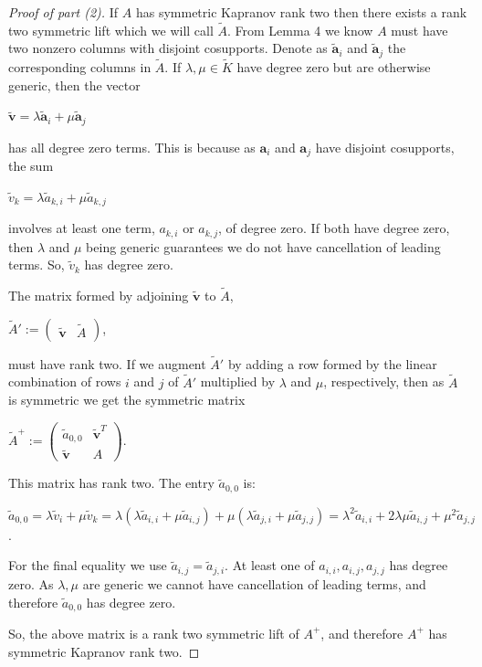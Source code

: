 \documentclass{article}
\begin{document}
\begin{proof}[Proof of part (2)]
  If $A$ has symmetric Kapranov rank two then there exists a rank two symmetric lift which we will call $\tilde{A}$. From Lemma 4 we know $A$ must have two nonzero columns with disjoint cosupports. Denote as $\tilde{\textbf{a}}_{i}$ and $\tilde{\textbf{a}}_{j}$ the corresponding columns in $\tilde{A}$. If $\lambda, \mu \in \tilde{K}$ have degree zero but are otherwise generic, then the vector
  \begin{center}
    $\tilde{\textbf{v}} = \lambda\tilde{\textbf{a}}_{i} + \mu\tilde{\textbf{a}}_{j}$
  \end{center}
  has all degree zero terms. This is because as $\textbf{a}_{i}$ and $\textbf{a}_{j}$ have disjoint cosupports, the sum
  \begin{center}
    $\tilde{v}_{k} = \lambda \tilde{a}_{k,i} + \mu \tilde{a}_{k,j}$
  \end{center}
  involves at least one term, $a_{k,i}$ or $a_{k,j}$, of degree zero. If both have degree zero, then $\lambda$ and $\mu$ being generic guarantees we do not have cancellation of leading terms. So, $\tilde{v}_{k}$ has degree zero.

  The matrix formed by adjoining $\tilde{\textbf{v}}$ to $\tilde{A}$,
  \begin{center}
    $\tilde{A}' := \left(\begin{array}{cc} \tilde{\textbf{v}} & \tilde{A} \end{array}\right)$,
  \end{center}
  must have rank two. If we augment $\tilde{A}'$ by adding a row formed by the linear combination of rows $i$ and $j$ of $\tilde{A}'$ multiplied by $\lambda$ and $\mu$, respectively, then as $\tilde{A}$ is symmetric we get the symmetric matrix
  \begin{center}
    $\tilde{A}^{+} := \left(\begin{array}{cc} \tilde{a}_{0,0} & \tilde{\textbf{v}}^{T} \\ \tilde{\textbf{v}} & A \end{array}\right)$.
  \end{center}
  This matrix has rank two. The entry $\tilde{a}_{0,0}$ is:
  \begin{center}
    $\tilde{a}_{0,0} = \lambda \tilde{v}_{i} + \mu \tilde{v}_{k} = \lambda (\lambda \tilde{a}_{i,i} + \mu \tilde{a}_{i,j}) + \mu (\lambda \tilde{a}_{j,i} + \mu \tilde{a}_{j,j}) = \lambda^{2}\tilde{a}_{i,i} + 2\lambda\mu \tilde{a}_{i,j} + \mu^{2}\tilde{a}_{j,j}$.
  \end{center}
  For the final equality we use $\tilde{a}_{i,j} = \tilde{a}_{j,i}$. At least one of $a_{i,i}, a_{i,j}, a_{j,j}$ has degree zero. As $\lambda, \mu$ are generic we cannot have cancellation of leading terms, and therefore $\tilde{a}_{0,0}$ has degree zero.
  
  So, the above matrix is a rank two symmetric lift of $A^{+}$, and therefore $A^{+}$ has symmetric Kapranov rank two.
\end{proof}
\end{document}
